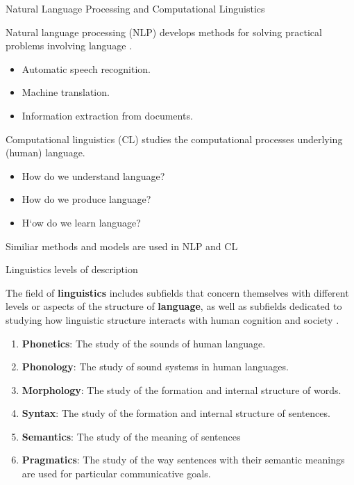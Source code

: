 \documentclass[handout]{beamer}
\begin{document}
\begin{frame}{Natural Language Processing and Computational Linguistics}
\begin{scriptsize}
Natural language processing (NLP) develops methods for solving practical problems involving language \cite{JohnsonMLSS}.

\begin{itemize}
\item Automatic speech recognition.
\item Machine translation.
\item Information extraction from documents.
\end{itemize}

Computational linguistics (CL) studies the computational processes underlying (human) language.

\begin{itemize}
 \item How do we understand language?
 \item How do we produce language?
 \item H`ow do we learn language?
\end{itemize}

Similiar methods and models are used in NLP and CL
\end{scriptsize}
\end{frame}



\begin{frame}{Linguistics levels of description}
\begin{scriptsize}
The field of \textbf{linguistics} includes subfields that concern themselves with different levels or aspects of the structure of \textbf{language}, as well as subfields dedicated to studying how linguistic structure interacts with human cognition and society \cite{bender2013linguistic}.
\begin{enumerate}
 \item \textbf{Phonetics}: The study of the sounds of human language.
 \item \textbf{Phonology}: The study of sound systems in human languages.
 \item \textbf{Morphology}: The study of the formation and internal structure of words.
 \item \textbf{Syntax}: The study of the formation and internal structure of sentences.
 \item \textbf{Semantics}: The study of the meaning of sentences
 \item \textbf{Pragmatics}: The study of the way sentences with their semantic meanings are
used for particular communicative goals.
\end{enumerate}


\end{scriptsize}
\end{frame}
\end{document}

